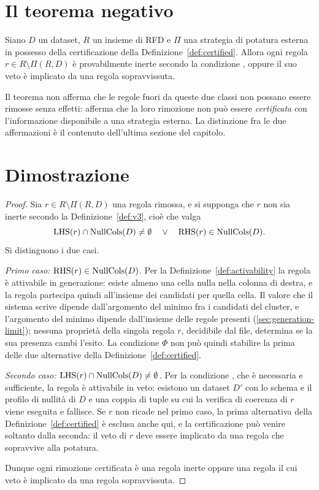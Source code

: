 \section{Il teorema negativo}\label{sec:negative-theorem}

\begin{theorem}\label{thm:negative}
Siano $D$ un dataset, $R$ un insieme di RFD e $\Pi$ una strategia di potatura esterna in possesso
della certificazione della Definizione~\ref{def:certified}. Allora ogni regola
$r \in R \setminus \Pi(R, D)$ è provabilmente inerte secondo la condizione \Vthree{}, oppure il
suo veto è implicato da una regola sopravvissuta.
\end{theorem}

Il teorema non afferma che le regole fuori da queste due classi non possano essere rimosse senza
effetti: afferma che la loro rimozione non può essere \emph{certificata} con l'informazione
disponibile a una strategia esterna. La distinzione fra le due affermazioni è il contenuto
dell'ultima sezione del capitolo.

\section{Dimostrazione}\label{sec:theory-proof}

\begin{proof}
Sia $r \in R \setminus \Pi(R, D)$ una regola rimossa, e si supponga che $r$ non sia inerte secondo
la Definizione~\ref{def:v3}, cioè che valga
\[
    \mathrm{LHS}(r) \cap \mathrm{NullCols}(D) \neq \emptyset \quad \vee \quad \mathrm{RHS}(r) \in \mathrm{NullCols}(D).
\]
Si distinguono i due casi.

\emph{Primo caso: $\mathrm{RHS}(r) \in \mathrm{NullCols}(D)$.} Per la Definizione~\ref{def:activability} la regola
è attivabile in generazione: esiste almeno una cella nulla nella colonna di destra, e la regola
partecipa quindi all'insieme dei candidati per quella cella. Il valore che il sistema scrive
dipende dall'argomento del minimo fra i candidati del cluster, e l'argomento del minimo dipende
dall'insieme delle regole presenti (\autoref{sec:generation-limit}); nessuna proprietà della
singola regola $r$, decidibile dal file, determina se la sua presenza cambi l'esito. La condizione
$\Phi$ non può quindi stabilire la prima delle due alternative della
Definizione~\ref{def:certified}.

\emph{Secondo caso: $\mathrm{LHS}(r) \cap \mathrm{NullCols}(D) \neq \emptyset$.} Per la condizione \Vone{}, che è
necessaria e sufficiente, la regola è attivabile in veto: esistono un dataset $D'$ con lo schema e
il profilo di nullità di $D$ e una coppia di tuple su cui la verifica di coerenza di $r$ viene
eseguita e fallisce. Se $r$ non ricade nel primo caso, la prima alternativa della
Definizione~\ref{def:certified} è esclusa anche qui, e la certificazione può venire soltanto dalla
seconda: il veto di $r$ deve essere implicato da una regola che sopravvive alla potatura.

Dunque ogni rimozione certificata è una regola inerte oppure una regola il cui veto è implicato da
una regola sopravvissuta.
\end{proof}

